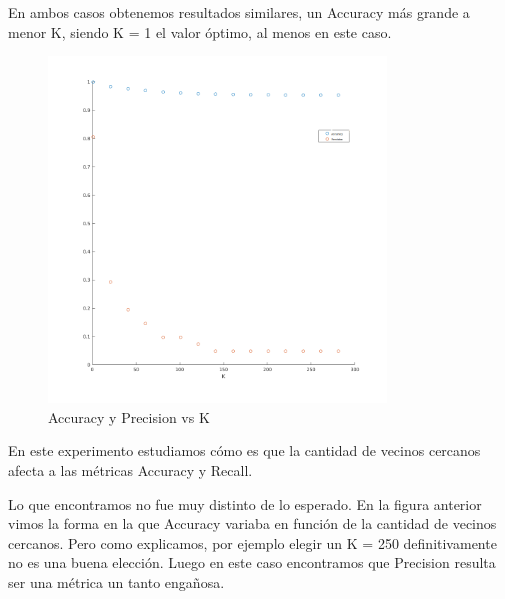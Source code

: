 En ambos casos obtenemos resultados similares, un Accuracy más grande a menor K, siendo K = 1 el valor óptimo, al menos en este caso.

\begin{figure}[H]
	\centering	
	\includegraphics[width=0.8\textwidth]{img/acu_pre.png}
	\caption{Accuracy y Precision vs K}
	\label{fig: Accuracy y Precision vs K con KNN}
\end{figure}

En este experimento estudiamos cómo es que la cantidad de vecinos cercanos afecta a las métricas Accuracy y Recall.

Lo que encontramos no fue muy distinto de lo esperado. En la figura anterior vimos la forma en la que Accuracy variaba en función de la cantidad de vecinos cercanos. Pero como explicamos, por ejemplo elegir un K = 250 definitivamente no es una buena elección. Luego en este caso encontramos que Precision resulta ser una métrica un tanto engañosa.


